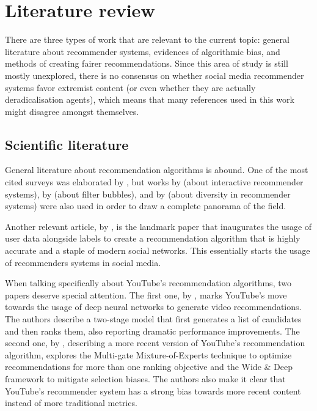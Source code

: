 
\chapter{Literature review}
\label{cap:review}

There are three types of work that are relevant to the current topic: general
literature about recommender systems, evidences of algorithmic bias, and methods
of creating fairer recommendations. Since this area of study is still mostly
unexplored, there is no consensus on whether social media recommender systems
favor extremist content (or even whether they are actually deradicalisation
agents), which means that many references used in this work might disagree
amongst themselves.

\section{Scientific literature}
\label{cap:scientific}

General literature about recommendation algorithms is abound. One of the most
cited surveys was elaborated by \citet{bobadilla_recommender_2013}, but works by
\citet{he_interactive_2016} (about interactive recommender systems), by
\citep{nguyen_exploring_2014} (about filter bubbles), and by
\citet{kunaver_diversity_2017} (about diversity in recommender systems) were
also used in order to draw a complete panorama of the field.

Another relevant article, by \citet{guy_social_2010}, is the landmark paper that
inaugurates the usage of user data alongside labels to create a recommendation
algorithm that is highly accurate and a staple of modern social networks. This
essentially starts the usage of recommenders systems in social media.

When talking specifically about YouTube's recommendation algorithms, two papers
deserve special attention. The first one, by \citet{covington_deep_2016}, marks
YouTube's move towards the usage of deep neural networks to generate video
recommendations. The authors describe a two-stage model that first generates a
list of candidates and then ranks them, also reporting dramatic performance
improvements. The second one, by \citet{zhao_recommending_2019}, describing a
more recent version of YouTube's recommendation algorithm, explores the
Multi-gate Mixture-of-Experts technique to optimize recommendations for more
than one ranking objective and the Wide \& Deep framework to mitigate selection
biases. The authors also make it clear that YouTube's recommender system has a
strong bias towards more recent content instead of more traditional metrics.

